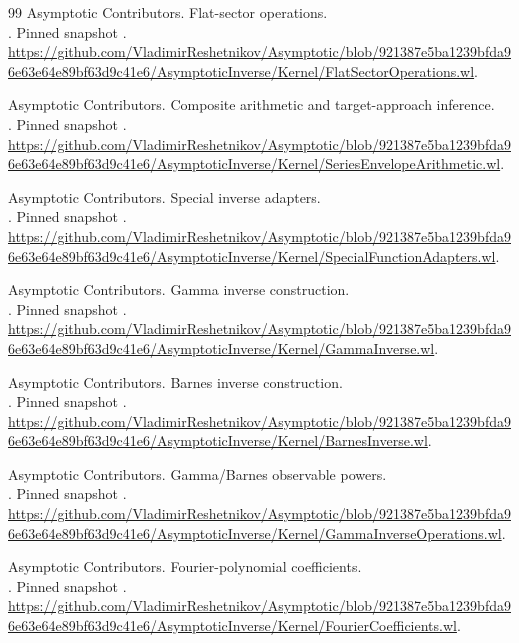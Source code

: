 \begin{thebibliography}{99}
 Asymptotic Contributors. Flat-sector operations.\\
. Pinned snapshot . \url{https://github.com/VladimirReshetnikov/Asymptotic/blob/921387e5ba1239bfda96e63e64e89bf63d9c41e6/AsymptoticInverse/Kernel/FlatSectorOperations.wl}.

 Asymptotic Contributors. Composite arithmetic and target-approach inference.\\
. Pinned snapshot . \url{https://github.com/VladimirReshetnikov/Asymptotic/blob/921387e5ba1239bfda96e63e64e89bf63d9c41e6/AsymptoticInverse/Kernel/SeriesEnvelopeArithmetic.wl}.

 Asymptotic Contributors. Special inverse adapters.\\
. Pinned snapshot . \url{https://github.com/VladimirReshetnikov/Asymptotic/blob/921387e5ba1239bfda96e63e64e89bf63d9c41e6/AsymptoticInverse/Kernel/SpecialFunctionAdapters.wl}.

 Asymptotic Contributors. Gamma inverse construction.\\
. Pinned snapshot . \url{https://github.com/VladimirReshetnikov/Asymptotic/blob/921387e5ba1239bfda96e63e64e89bf63d9c41e6/AsymptoticInverse/Kernel/GammaInverse.wl}.

 Asymptotic Contributors. Barnes inverse construction.\\
. Pinned snapshot . \url{https://github.com/VladimirReshetnikov/Asymptotic/blob/921387e5ba1239bfda96e63e64e89bf63d9c41e6/AsymptoticInverse/Kernel/BarnesInverse.wl}.

 Asymptotic Contributors. Gamma/Barnes observable powers.\\
. Pinned snapshot . \url{https://github.com/VladimirReshetnikov/Asymptotic/blob/921387e5ba1239bfda96e63e64e89bf63d9c41e6/AsymptoticInverse/Kernel/GammaInverseOperations.wl}.

 Asymptotic Contributors. Fourier-polynomial coefficients.\\
. Pinned snapshot . \url{https://github.com/VladimirReshetnikov/Asymptotic/blob/921387e5ba1239bfda96e63e64e89bf63d9c41e6/AsymptoticInverse/Kernel/FourierCoefficients.wl}.


\end{thebibliography}
